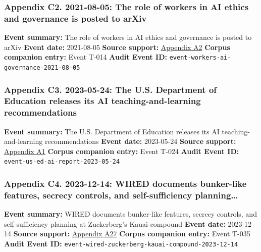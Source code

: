 \documentclass[
  american,
  11pt,
  letterpaper,
]{article}
\begin{document}
\subsubsection{Appendix C2. 2021-08-05: The role of workers in AI ethics
and governance is posted to
arXiv}\label{ch-10-appendix-c2-2021-08-05-the-role-of-workers-in-ai-ethics-and-governance-is-posted-to-arxiv}

\textbf{Event summary:} The role of workers in AI ethics and governance
is posted to arXiv \textbf{Event date:} 2021-08-05 \textbf{Source
support:}
\hyperref[ch-10-appendix-a2-in-oxford-handbook-on-ai-governance-the-role-of-workers-in-ai-ethics-and-governance]{Appendix
A2} \textbf{Corpus companion entry:} Event T-014 \textbf{Audit Event
ID:} \texttt{event-workers-ai-governance-2021-08-05}

\subsubsection{Appendix C3. 2023-05-24: The U.S. Department of Education
releases its AI teaching-and-learning
recommendations}\label{ch-10-appendix-c3-2023-05-24-the-u-s-department-of-education-releases-its-ai-teaching-and-learning-recommendations}

\textbf{Event summary:} The U.S. Department of Education releases its AI
teaching-and-learning recommendations \textbf{Event date:} 2023-05-24
\textbf{Source support:}
\hyperref[ch-10-appendix-a1-artificial-intelligence-and-the-future-of-teaching-and-learning-insights-and-recommendations]{Appendix
A1} \textbf{Corpus companion entry:} Event T-024 \textbf{Audit Event
ID:} \texttt{event-us-ed-ai-report-2023-05-24}

\subsubsection{Appendix C4. 2023-12-14: WIRED documents bunker-like
features, secrecy controls, and self-sufficiency
planning\ldots{}}\label{ch-10-appendix-c4-2023-12-14-wired-documents-bunker-like-features-secrecy-controls-and-self-sufficiency-planning-at-zuckerberg-s-kauai-compound}

\textbf{Event summary:} WIRED documents bunker-like features, secrecy
controls, and self-sufficiency planning at Zuckerberg's Kauai compound
\textbf{Event date:} 2023-12-14 \textbf{Source support:}
\hyperref[ch-10-appendix-a27-inside-mark-zuckerbergs-top-secret-hawaii-compound]{Appendix
A27} \textbf{Corpus companion entry:} Event T-035 \textbf{Audit Event
ID:} \texttt{event-wired-zuckerberg-kauai-compound-2023-12-14}
\end{document}
